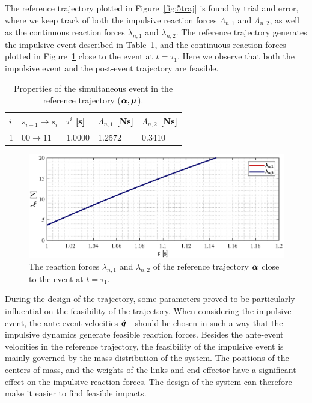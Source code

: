 \documentclass[../DC2019003Bouma.tex]{subfiles}
\begin{document}
The reference trajectory plotted in Figure~\ref{fig:5traj} is found by trial and error, where we keep track of both the impulsive reaction forces $\Lambda_{n,1}$ and $\Lambda_{n,2}$, as well as the continuous reaction forces $\lambda_{n,1}$ and $\lambda_{n,2}$. The reference trajectory generates the impulsive event described in Table~\ref{tab:simevent}, and the continuous reaction forces plotted in Figure~\ref{fig:5lambdaref} close to the event at $t=\tau_1$. Here we observe that both the impulsive event and the post-event trajectory are feasible.
\begin{table}[h!]
\centering
\caption{Properties of the simultaneous event in the reference trajectory ($\boldsymbol{\alpha},\boldsymbol{\mu}$).}\label{tab:simevent}
\begin{tabular}{l|l|l|l|l}
$i$ & $s_{i-1}\rightarrow s_i$ & $\tau^i$ {[}s{]} & $\Lambda_{n,1}$ {[}Ns{]} & $\Lambda_{n,2}$ {[}Ns{]} \\ \hline
1   & $00\rightarrow 11$       & 1.0000        & 1.2572                   & 0.3410        
\end{tabular}
\end{table}
\begin{figure}[h!]
\centering
\includegraphics[width=\textwidth]{lambdaref.eps}\caption{The reaction forces $\lambda_{n,1}$ and $\lambda_{n,2}$ of the reference trajectory $\boldsymbol{\alpha}$ close to the event at $t=\tau_1$.}\label{fig:5lambdaref}
\end{figure}

During the design of the trajectory, some parameters proved to be particularly influential on the feasibility of the trajectory. When considering the impulsive event, the ante-event velocities $\dot{{\boldsymbol{q}}}^-$ should be chosen in such a way that the impulsive dynamics generate feasible reaction forces. Besides the ante-event velocities in the reference trajectory, the feasibility of the impulsive event is mainly governed by the mass distribution of the system. The positions of the centers of mass, and the weights of the links and end-effector have a significant effect on the impulsive reaction forces. The design of the system can therefore make it easier to find feasible impacts.
\end{document}
